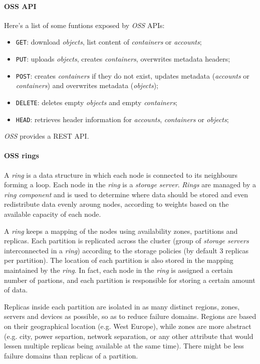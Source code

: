 \paragraph{OSS API}
Here's a list of some funtions exposed by \emph{OSS} APIs:
\begin{itemize}
    \item \texttt{GET}: download \emph{objects}, list content of \emph{containers} or
    \emph{accounts};
    \item \texttt{PUT}: uploads \emph{objects}, creates \emph{containers},
    overwrites metadata headers;
    \item \texttt{POST}: creates \emph{containers} if they do not exist, updates
    metadata (\emph{accounts} or \emph{containers}) and overwrites metadata
    (\emph{objects});
    \item \texttt{DELETE}: deletes empty \emph{objects} and empty \emph{containers};
    \item \texttt{HEAD}: retrieves header information for \emph{accounts}, \emph{containers}
    or \emph{objects};
\end{itemize}

\begin{note}
    \emph{OSS} provides a REST API.
\end{note}

\paragraph{OSS rings}
A \emph{ring} is a data structure in which each node is connected to its
neighbours forming a loop. Each node in the \emph{ring} is a \emph{storage server}.
\emph{Rings} are managed by a \emph{ring component} and is used to determine
where data should be stored and even redistribute data evenly aroung nodes,
according to weights based on the available capacity of each node.

A \emph{ring} keeps a mapping of the nodes using availability zones, partitions
and replicas. Each partition is replicated across the cluster (group of
\emph{storage servers} interconnected in a \emph{ring}) according to the
storage policies (by default 3 replicas per partition). The location of each
partition is also stored in the mapping maintained by the \emph{ring}. In fact,
each node in the \emph{ring} is assigned a certain number of partions, and each
partition is responsible for storing a certain amount of data.

Replicas inside each partition are isolated in as many distinct regions, zones,
servers and devices as possible, so as to reduce failure domains. Regions are
based on their geographical location (e.g. West Europe), while zones are more
abstract (e.g. city, power separtion, network separation, or any other attribute
that would lessen multiple replicas being available at the same time). There
might be less failure domains than replicas of a partition.

